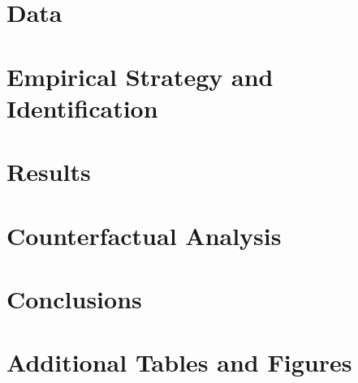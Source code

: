 \documentclass{article}
\begin{document}
\section{Data}\label{sec:data}
    

\section{Empirical Strategy and Identification}\label{sec:empirical_strategy}
    

\section{Results}\label{sec:results}
    

\section{Counterfactual Analysis}\label{sec:counterfactual}
    

\section{Conclusions}\label{sec:conclusion}
    



\clearpage
\printbibliography

\clearpage


\clearpage

\clearpage



\clearpage

\section*{}
\vspace{5mm}

\appendix

\renewcommand\thetable{\thesection.\arabic{table}}    
\renewcommand\thefigure{\thesection.\arabic{figure}} 
\setcounter{table}{0}
\setcounter{figure}{0}



\clearpage
\section{Additional Tables and Figures}


\clearpage
%
\end{document}
